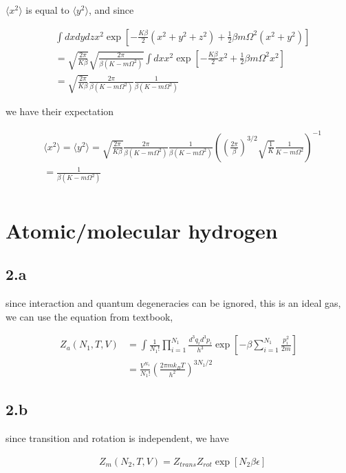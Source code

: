 \documentclass{article}
\begin{document}
$\langle x^2 \rangle$ is equal to $\langle y^2 \rangle$, and since

$$
\begin{aligned}
    &\int dxdydz x^2 \exp[- \frac{K\beta}{2}(x^2 + y^2 + z^2) + \frac{1}{2}\beta m \Omega^2(x^2 + y^2)]\\
    &=\sqrt{\frac{2\pi}{K\beta}} \sqrt{\frac{2\pi}{\beta (K - m\Omega^2)}} \int dx x^2 \exp[- \frac{K\beta}{2}x^2 + \frac{1}{2}\beta m \Omega^2 x^2]\\
    &=\sqrt{\frac{2\pi}{K\beta}} \frac{2\pi}{\beta (K - m\Omega^2)} \frac{1}{\beta (K - m\Omega^2)}
\end{aligned}
$$

we have their expectation

$$
\begin{aligned}
    &\langle x^2 \rangle = \langle y^2 \rangle = \sqrt{\frac{2\pi}{K\beta}} \frac{2\pi}{\beta (K - m\Omega^2)} \frac{1}{\beta (K - m\Omega^2)}
    ((\frac{2\pi}{\beta})^{3/2}\sqrt{\frac{1}{K}} \frac{1}{K - m \Omega^2})^{-1}\\
    &=\frac{1}{\beta (K - m\Omega^2)}\\
\end{aligned}
$$

\section*{Atomic/molecular hydrogen}
\subsection*{2.a}
since interaction and quantum degeneracies can be ignored, this is an ideal gas, we can use the equation from textbook,

$$
\begin{aligned}
    Z_a(N_1, T, V) &= \int \frac{1}{N_1!} \prod_{i=1}^{N_1}  \frac{d^3q_i d^3p_i}{h^3} \exp[-\beta \sum_{i=1}^{N_1} \frac{p_i^2}{2m}]\\
    &= \frac{V^{N_1}}{N_1!} (\frac{2\pi m k_B T}{h^2})^{3N_1/2}
\end{aligned}
$$

\subsection*{2.b}

since transition and rotation is independent, we have

$$
\begin{aligned}
    &Z_m(N_2, T, V) = Z_{trans} Z_{rot} \exp[N_2\beta\epsilon]\\
\end{aligned}
$$
\end{document}
